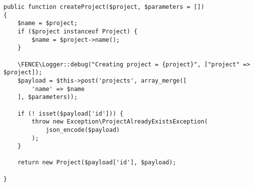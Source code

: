 \begin{lstlisting}
public function createProject($project, $parameters = [])
{
    $name = $project;
    if ($project instanceof Project) {
        $name = $project->name();
    }

    \FENCE\Logger::debug("Creating project = {project}", ["project" => $project]);
    $payload = $this->post('projects', array_merge([
        'name' => $name
    ], $parameters));

    if (! isset($payload['id'])) {
        throw new Exception\ProjectAlreadyExistsException(
            json_encode($payload)
        );
    }

    return new Project($payload['id'], $payload);

}
\end{lstlisting}